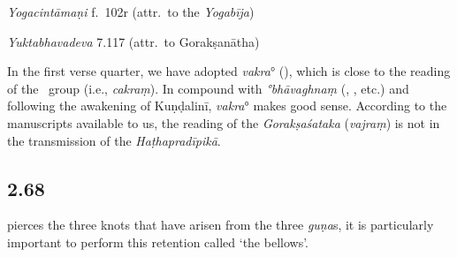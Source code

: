 \begin{ekdosis}
\begin{testimonia}[hp02_067]
\emph{Yogacintāmaṇi} f.~102r (attr.~to the \emph{Yogabīja})

\begin{versinnote}
\end{versinnote}


\emph{Yuktabhavadeva} 7.117 (attr.~to Gorakṣanātha)

\begin{versinnote}
\end{versinnote}
\end{testimonia}

\begin{philcomm}[hp02_067]

In the first verse quarter, we have adopted \textit{vakra}° (\epsilonOne), which is close to the reading of the \textalpha\ group (i.e., \emph{cakraṃ}). In compound with \textit{°bhāvaghnaṃ} (\alphaOne, \alphaThree, etc.) and following the awakening of Kuṇḍalinī, \textit{vakra}° makes good sense. According to the manuscripts available to us, the reading of the \emph{Gorakṣaśataka} (\emph{vajraṃ}) is not in the transmission of the \textit{Haṭhapradīpikā}.


\end{philcomm}

\subsection*{2.68}
\begin{translation} pierces the three knots that have arisen from the three \emph{guṇa}s, it is particularly important to perform this retention called ‘the bellows’.
\end{translation}


\end{ekdosis}
